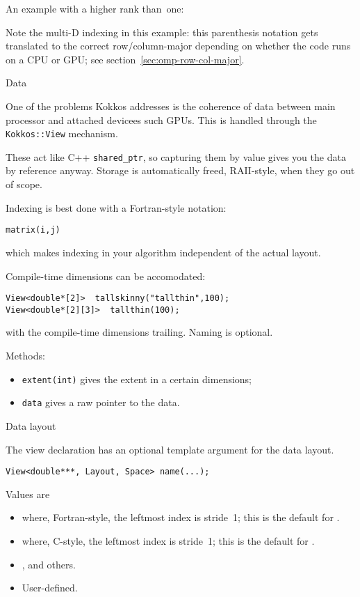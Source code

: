 An example with a higher rank than~one:
%

Note the multi-D indexing in this example: this parenthesis notation
gets translated to the correct row/column-major depending on whether the
code runs on a CPU or GPU; see section~\ref{sec:omp-row-col-major}.

 {Data}
\label{sec:kokkos-data}

One of the problems Kokkos addresses is the coherence of data between
main processor and attached devicees such \acp{GPU}.
This is handled through the \lstinline+Kokkos::View+ mechanism.


These act like C++ \lstinline+shared_ptr+, so capturing them by value
gives you the data by reference anyway.
Storage is automatically freed, RAII-style,
when they go out of scope.

Indexing is best done with a Fortran-style notation:
\begin{lstlisting}
matrix(i,j)
\end{lstlisting}
which makes indexing in your algorithm independent
of the actual layout.

Compile-time dimensions can be accomodated:
\begin{lstlisting}
View<double*[2]>  tallskinny("tallthin",100);
View<double*[2][3]>  tallthin(100);
\end{lstlisting}
with the compile-time dimensions trailing. Naming is optional.

Methods:
\begin{itemize}
\item \lstinline{extent(int)} gives the extent in a certain dimensions;
\item \lstinline{data} gives a raw pointer to the data.
\end{itemize}

 {Data layout}

The view declaration has an optional template argument for the data layout.
\begin{lstlisting}
View<double***, Layout, Space> name(...);
\end{lstlisting}
Values are 
\begin{itemize}
\item {} where, Fortran-style, the leftmost index is stride~1;
  this is the default for .
\item {} where, C-style, the leftmost index is stride~1;
  this is the default for .
\item {},  and others.
\item User-defined.
\end{itemize}

